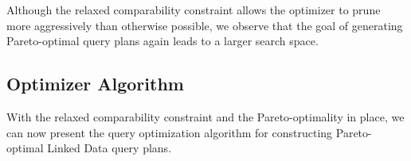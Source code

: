Although the relaxed comparability constraint allows the optimizer to
prune more aggressively than otherwise possible, we observe that the
goal of generating Pareto-optimal query plans again leads to a larger
search space.

\subsection{Optimizer Algorithm}

With the relaxed comparability constraint and the Pareto-optimality
in place, we can now present the query optimization algorithm for
constructing Pareto-optimal Linked Data query plans.






